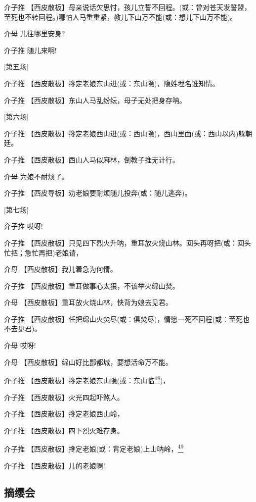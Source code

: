 介子推
【西皮散板】母亲说话欠思忖，孩儿立誓不回程。(或：曾对苍天发誓盟，至死也不转回程。)哪怕人马重重紧，教儿下山万不能(或：想儿下山万不能)。

介母 儿往哪里安身?

介子推 随儿来啊!

{[}第五场{]}

介子推 【西皮散板】搀定老娘东山进(或：东山隐)，隐姓埋名谁知情。

介子推 【西皮散板】东山人马乱纷纭，母子无处把身存呐。

{[}第六场{]}

介子推
【西皮散板】搀定老娘西山进(或：西山隐)，西山里面(或：西山以内)躲朝廷。

介子推 【西皮散板】西山人马似麻林，倒教子推无计行。

介母 为娘不耐烦了。

介子推 【西皮导板】劝老娘要耐烦随儿投奔(或：随儿逃奔)。

{[}第七场{]}

介子推 哎呀!

介子推
【西皮散板】只见四下烈火升呐，重耳放火烧山林。回头再呀把(或：回头忙把；急忙再把)老娘请，

介母 【西皮散板】我儿着急为何情。

介子推 【西皮散板】重耳做事心太狠，不该举火绵山焚。

介母 【西皮散板】重耳放火烧山林，快背为娘去见君。

介子推
【西皮散板】任把绵山火焚尽(或：俱焚尽)，情愿一死不回程(或：至死也不去见君)。

介母 哎呀!

介母 【西皮散板】绵山好比酆都城，要想活命万不能。

介子推
【西皮散板】搀定老娘东山隐(或：东山临\protect\hyperlink{fn48}{\textsuperscript{48}})，

介子推 【西皮散板】火光四起吓煞人。

介子推 【西皮散板】搀定老娘西山岭，

介子推 【西皮散板】四下烈火难存身。

介子推
【西皮散板】搀定老娘(或：背定老娘)上山呐岭，\protect\hyperlink{fn49}{\textsuperscript{49}}

介子推 【西皮散板】儿的老娘啊!

\newpage
\hypertarget{ux6458ux7f28ux4f1a}{%
\subsection{摘缨会}\label{ux6458ux7f28ux4f1a}}

